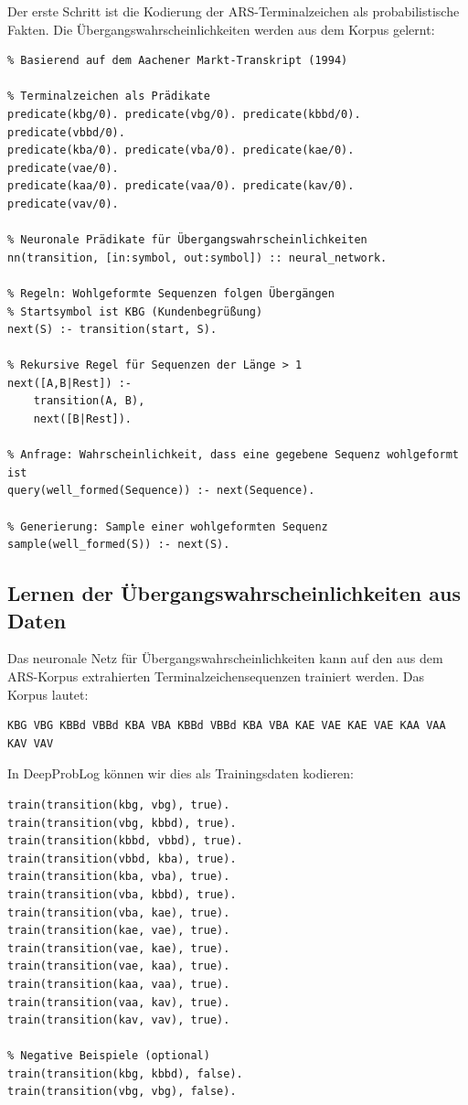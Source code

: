 \documentclass[12pt,a4paper]{article}
\begin{document}
Der erste Schritt ist die Kodierung der ARS-Terminalzeichen als probabilistische 
Fakten. Die Übergangswahrscheinlichkeiten werden aus dem Korpus gelernt:

\begin{lstlisting}[caption=DeepProbLog-Kodierung der ARS-Grammatik]
% DeepProbLog-Implementierung der ARS-Grammatik für Verkaufsgespräche
% Basierend auf dem Aachener Markt-Transkript (1994)

% Terminalzeichen als Prädikate
predicate(kbg/0). predicate(vbg/0). predicate(kbbd/0). predicate(vbbd/0).
predicate(kba/0). predicate(vba/0). predicate(kae/0). predicate(vae/0).
predicate(kaa/0). predicate(vaa/0). predicate(kav/0). predicate(vav/0).

% Neuronale Prädikate für Übergangswahrscheinlichkeiten
nn(transition, [in:symbol, out:symbol]) :: neural_network.

% Regeln: Wohlgeformte Sequenzen folgen Übergängen
% Startsymbol ist KBG (Kundenbegrüßung)
next(S) :- transition(start, S).

% Rekursive Regel für Sequenzen der Länge > 1
next([A,B|Rest]) :-
    transition(A, B),
    next([B|Rest]).

% Anfrage: Wahrscheinlichkeit, dass eine gegebene Sequenz wohlgeformt ist
query(well_formed(Sequence)) :- next(Sequence).

% Generierung: Sample einer wohlgeformten Sequenz
sample(well_formed(S)) :- next(S).
\end{lstlisting}

\subsection{Lernen der Übergangswahrscheinlichkeiten aus Daten}

Das neuronale Netz für Übergangswahrscheinlichkeiten kann auf den aus dem 
ARS-Korpus extrahierten Terminalzeichensequenzen trainiert werden. Das Korpus 
lautet:

\begin{verbatim}
KBG VBG KBBd VBBd KBA VBA KBBd VBBd KBA VBA KAE VAE KAE VAE KAA VAA KAV VAV
\end{verbatim}

In DeepProbLog können wir dies als Trainingsdaten kodieren:

\begin{lstlisting}[caption=Kodierung der Trainingsdaten]
% Trainingsbeispiele: beobachtete Übergänge
train(transition(kbg, vbg), true).
train(transition(vbg, kbbd), true).
train(transition(kbbd, vbbd), true).
train(transition(vbbd, kba), true).
train(transition(kba, vba), true).
train(transition(vba, kbbd), true).
train(transition(vba, kae), true).
train(transition(kae, vae), true).
train(transition(vae, kae), true).
train(transition(vae, kaa), true).
train(transition(kaa, vaa), true).
train(transition(vaa, kav), true).
train(transition(kav, vav), true).

% Negative Beispiele (optional)
train(transition(kbg, kbbd), false).
train(transition(vbg, vbg), false).
\end{lstlisting}
\end{document}
